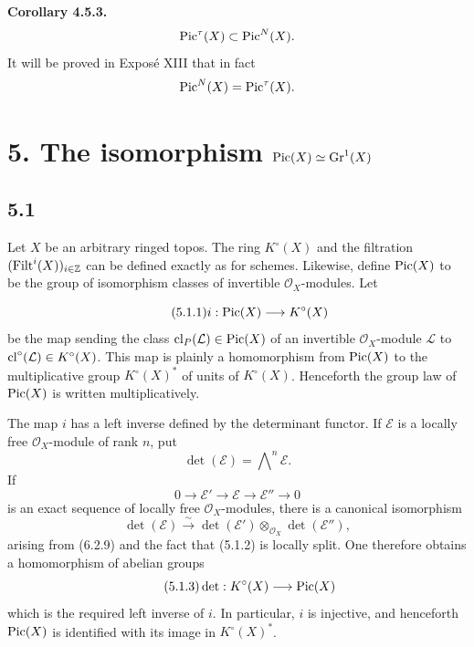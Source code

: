 \textbf{Corollary 4.5.3.}
\[
\operatorname{Pic}^\tau(X)\subset\operatorname{Pic}^N(X).
\]
It will be proved in Expos\'e XIII that in fact
\[
\operatorname{Pic}^N(X)=\operatorname{Pic}^\tau(X).
\]

\section*{5. The isomorphism $\operatorname{Pic}(X)\simeq\operatorname{Gr}^1(X)$}

\subsection*{5.1}
Let $X$ be an arbitrary ringed topos. The ring $K^\circ(X)$ and the
filtration $(\operatorname{Filt}^i(X))_{i\in\mathbb Z}$ can be defined exactly as for
schemes. Likewise, define $\operatorname{Pic}(X)$ to be the group of isomorphism classes of
invertible $\mathcal O_X$-modules. Let

\begin{equation}\tag{5.1.1}
i:\operatorname{Pic}(X)\longrightarrow K^\circ(X)
\end{equation}
be the map sending the class $\operatorname{cl}_P(\mathcal L)\in\operatorname{Pic}(X)$ of an invertible
$\mathcal O_X$-module $\mathcal L$ to
$\operatorname{cl}^\circ(\mathcal L)\in K^\circ(X)$. This map is plainly a homomorphism
from $\operatorname{Pic}(X)$ to the multiplicative group $K^\circ(X)^*$ of units of
$K^\circ(X)$. Henceforth the group law of $\operatorname{Pic}(X)$ is written
multiplicatively.

The map $i$ has a left inverse defined by the determinant functor. If
$\mathcal E$ is a locally free $\mathcal O_X$-module of rank $n$, put
\[
\det(\mathcal E)=\bigwedge\nolimits^n\mathcal E.
\]
If
\begin{equation}\tag{5.1.2}
0\longrightarrow\mathcal E'\longrightarrow\mathcal E
\longrightarrow\mathcal E''\longrightarrow0
\end{equation}
is an exact sequence of locally free $\mathcal O_X$-modules, there is a
canonical isomorphism
\[
\det(\mathcal E)\xrightarrow{\sim}
\det(\mathcal E')\otimes_{\mathcal O_X}\det(\mathcal E''),
\]
arising from (6.2.9) and the fact that (5.1.2) is locally split. One therefore
obtains a homomorphism of abelian groups
\begin{equation}\tag{5.1.3}
\det:K^\circ(X)\longrightarrow\operatorname{Pic}(X)
\end{equation}
which is the required left inverse of $i$. In particular, $i$ is injective,
and henceforth $\operatorname{Pic}(X)$ is identified with its image in $K^\circ(X)^*$.

